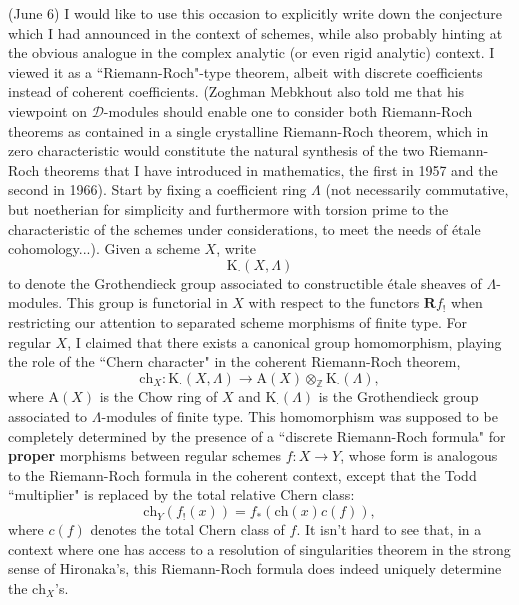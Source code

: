 (June 6) I would like to use this occasion to explicitly write down the conjecture which I had announced in the context of schemes, while also probably hinting at the obvious analogue in the complex analytic (or even rigid analytic) context. I viewed it as a ``Riemann-Roch"-type theorem, albeit with discrete coefficients instead of coherent coefficients. (Zoghman Mebkhout also told me that his viewpoint on $\mathcal{D}$-modules should enable one to consider both Riemann-Roch theorems as contained in a single crystalline Riemann-Roch theorem, which in zero characteristic would constitute the natural synthesis of the two Riemann-Roch theorems that I have introduced in mathematics, the first in 1957 and the second in 1966). Start by fixing a coefficient ring $\Lambda$ (not necessarily commutative, but noetherian for simplicity and furthermore with torsion prime to the characteristic of the schemes under considerations, to meet the needs of \'etale cohomology...). Given a scheme $X$, write 
$$ \text{K}_{\cdot}(X, \Lambda) $$
to denote the Grothendieck group associated to constructible \'etale sheaves of $\Lambda$-modules. This group is functorial in $X$ with respect to the functors $\textbf{R}f_!$ when restricting our attention to separated scheme morphisms of finite type. For regular $X$, I claimed that there exists a canonical group homomorphism, playing the role of the ``Chern character" in the coherent Riemann-Roch theorem,
\begin{equation}\label{chern1.1} 
\text{ch}_X: \text{K}_{\cdot}(X, \Lambda) \to \text{A}(X) \otimes_{\mathbb{Z}} \text{K}_{\cdot}(\Lambda),
\end{equation}
where $\text{A}(X)$ is the Chow ring of $X$ and $\text{K}_{\cdot}(\Lambda)$ is the Grothendieck group associated to $\Lambda$-modules of finite type. This homomorphism was supposed to be completely determined by the presence of a ``discrete Riemann-Roch formula" for \textbf{proper} morphisms between regular schemes $f: X \to Y$, whose form is analogous to the Riemann-Roch formula in the coherent context, except that the Todd ``multiplier" is replaced by the total relative Chern class:
$$ \text{ch}_Y(f_!(x)) = f_*(\text{ch}(x)c(f)), $$
where $c(f)$ denotes the total Chern class of $f$. It isn't hard to see that, in a context where one has access to a resolution of singularities theorem in the strong sense of Hironaka's, this Riemann-Roch formula does indeed uniquely determine the $\text{ch}_X$'s. 

